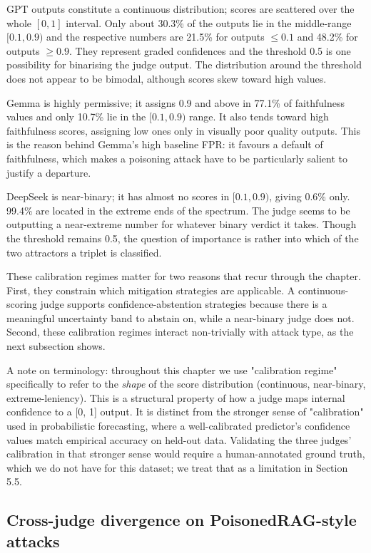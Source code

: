GPT outputs constitute a continuous distribution; scores are scattered over the whole $[0, 1]$ interval. Only about 30.3\% of the outputs lie in the middle-range $[0.1, 0.9)$ and the respective numbers are 21.5\% for outputs $\leq 0.1$ and 48.2\% for outputs $\geq 0.9$. They represent graded confidences and the threshold 0.5 is one possibility for binarising the judge output. The distribution around the threshold does not appear to be bimodal, although scores skew toward high values.

Gemma is highly permissive; it assigns 0.9 and above in 77.1\% of faithfulness values and only 10.7\% lie in the $[0.1, 0.9)$ range. It also tends toward high faithfulness scores, assigning low ones only in visually poor quality outputs. This is the reason behind Gemma's high baseline FPR: it favours a default of faithfulness, which makes a poisoning attack have to be particularly salient to justify a departure.

DeepSeek is near-binary; it has almost no scores in $[0.1, 0.9)$, giving 0.6\% only. 99.4\% are located in the extreme ends of the spectrum. The judge seems to be outputting a near-extreme number for whatever binary verdict it takes. Though the threshold remains 0.5, the question of importance is rather into which of the two attractors a triplet is classified.

These calibration regimes matter for two reasons that recur through the chapter. First, they constrain which mitigation strategies are applicable. A continuous-scoring judge supports confidence-abstention strategies because there is a meaningful uncertainty band to abstain on, while a near-binary judge does not. Second, these calibration regimes interact non-trivially with attack type, as the next subsection shows.

A note on terminology: throughout this chapter we use "calibration regime" specifically to refer to the \textit{shape} of the score distribution (continuous, near-binary, extreme-leniency). This is a structural property of how a judge maps internal confidence to a [0, 1] output. It is distinct from the stronger sense of "calibration" used in probabilistic forecasting, where a well-calibrated predictor's confidence values match empirical accuracy on held-out data. Validating the three judges' calibration in that stronger sense would require a human-annotated ground truth, which we do not have for this dataset; we treat that as a limitation in Section 5.5.

\subsection{Cross-judge divergence on PoisonedRAG-style attacks}

